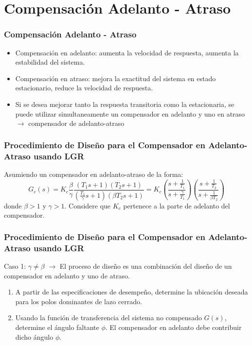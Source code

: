 \documentclass[aspectratio=169,handout]{beamer}
\theoremstyle{definition}
\theoremstyle{plain}
\theoremstyle{remark}
\newcounter{saveenumi}
\newcommand{\seti}{\setcounter{saveenumi}{\value{enumi}}}
\begin{document}
\section{Compensación Adelanto - Atraso}
\begin{frame}[<+->]\frametitle{Compensación Adelanto - Atraso}
	\begin{itemize}
		\item Compensación en adelanto: aumenta la velocidad de respuesta, aumenta la estabilidad del sistema.
		\item Compensación en atraso: mejora la exactitud del sistema en estado estacionario, reduce la velocidad de respuesta.
		\item Si se desea mejorar tanto la respuesta transitoria como la estacionaria, se puede utilizar simultaneamente un compensador en adelanto y uno en atraso $\rightarrow$ compensador de adelanto-atraso
	\end{itemize}
\end{frame}

\begin{frame}[<+->]\frametitle{Procedimiento de Diseño para el Compensador en Adelanto-Atraso usando LGR}
	Asumiendo un compensador en adelanto-atraso de la forma:
	\begin{equation*}
		G_c(s) = K_c \frac{\beta}{\gamma} \frac{(T_1 s + 1)(T_2 s + 1)}{(\frac{T_1}{\gamma} s + 1)(\beta T_2 s + 1)} = K_c \left( \frac{s+\frac{1}{T_1}}{s+\frac{\gamma}{T_1}} \right)\left( \frac{s+\frac{1}{T_2}}{s+\frac{1}{\beta T_2}} \right)
	\end{equation*}
	donde $\beta > 1$ y $\gamma > 1$. Considere que $K_c$ pertenece a la parte de adelanto del compensador.
\end{frame}

\begin{frame}[<+->]\frametitle{Procedimiento de Diseño para el Compensador en Adelanto-Atraso usando LGR}
\small
Caso 1: $\gamma \neq \beta$ $\rightarrow$ El proceso de diseño es una combinación del diseño de un compensador en adelanto y uno de atraso.
\pause
	\begin{enumerate}
		\item A partir de las especificaciones de desempeño, determine la ubicación deseada para los polos dominantes de lazo cerrado.
		\item Usando la función de transferencia del sistema no compensado $G(s)$, determine el ángulo faltante $\phi$. El compensador en adelanto debe contribuir dicho ángulo $\phi$.
		\seti
	\end{enumerate}
\end{frame}
\end{document}
